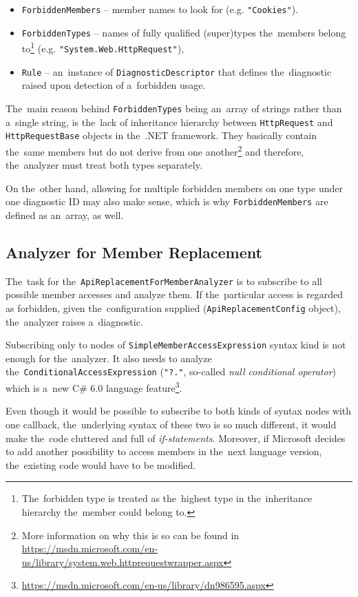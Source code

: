 \documentclass[
  digital, %
  table,   %
  lof,     %
  lot,     %
  oneside,
]{fithesis3}
\begin{document}
\begin{itemize}
  \item \texttt{ForbiddenMembers} -- member names to look for (e.g. \texttt{"Cookies"}).
  \item \texttt{ForbiddenTypes} -- names of fully qualified (super)types the~members belong to\footnote{The~forbidden type is treated as the~highest type in the~inheritance hierarchy the~member could belong to.
} (e.g. \texttt{"System.Web.HttpRequest"}), 
  \item \texttt{Rule} -- an~instance of \texttt{DiagnosticDescriptor} that defines the~diagnostic raised upon detection of a~forbidden usage.
\end{itemize} 

The~main reason behind \texttt{ForbiddenTypes} being an~array of strings rather than a~single string, is the~lack of inheritance hierarchy between \texttt{HttpRequest} and \texttt{HttpRequestBase} objects in the~.NET framework. They basically contain the~same members but do not derive from one another\footnote{More information on why this is so can be found in \url{https://msdn.microsoft.com/en-us/library/system.web.httprequestwrapper.aspx}} and therefore, the~analyzer must treat both types separately. 

On the~other hand, allowing for multiple forbidden members on one type under one diagnostic ID may also make sense, which is why \texttt{ForbiddenMembers} are defined as an~array, as well.

\subsection{Analyzer for Member Replacement}
The~task for the~\texttt{ApiReplacementForMemberAnalyzer} is to subscribe to all possible member accesses and analyze them. If the~particular access is regarded as forbidden, given the~configuration supplied (\texttt{ApiReplacementConfig} object), the~analyzer raises a~diagnostic.

Subscribing only to nodes of \texttt{SimpleMemberAccessExpression} syntax kind is not enough for the~analyzer. It also needs to analyze the~\texttt{ConditionalAccessExpression} (\texttt{"?."}, so-called \textit{null conditional operator}) which is a~new C\# 6.0 language feature\footnote{\url{https://msdn.microsoft.com/en-us/library/dn986595.aspx}}. 

Even though it would be possible to subscribe to both kinds of syntax nodes with one callback, the~underlying syntax of these two is so much different, it would make the~code cluttered and full of \textit{if-statements}. Moreover, if Microsoft decides to add another possibility to access members in the~next language version, the~existing code would have to be modified.
\end{document}
